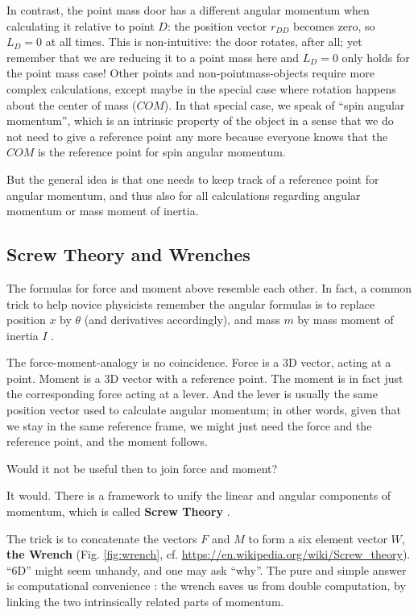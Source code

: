 In contrast, the point mass door has a different angular momentum when calculating it relative to point \(D\): the position vector \(r_{DD}\) becomes zero, so \(L_{D} = 0\) at all times.
This is non-intuitive: the door rotates, after all; yet remember that we are reducing it to a point mass here and \(L_{D} = 0\) only holds for the point mass case!
Other points and non-pointmass-objects require more complex calculations, except maybe in the special case where rotation happens about the center of mass (\(COM\)).
In that special case, we speak of ``spin angular momentum'', which is an intrinsic property of the object in a sense that we do not need to give a reference point any more because everyone knows that the \(COM\) is the reference point for spin angular momentum.


But the general idea is that one needs to keep track of a reference point for angular momentum, and thus also for all calculations regarding angular momentum or mass moment of inertia.


\FloatBarrier
\subsection{Screw Theory and Wrenches}
\label{sec:org14c81d2}

The formulas for force and moment above resemble each other.
In fact, a common trick to help novice physicists remember the angular formulas is to replace position \(x\) by \(\theta\) (and derivatives accordingly), and mass \(m\) by mass moment of inertia \(I\) \citep{Tipler2007}.

The force-moment-analogy is no coincidence.
Force is a 3D vector, acting at a point.
Moment is a 3D vector with a reference point.
The moment is in fact just the corresponding force acting at a lever.
And the lever is usually the same position vector used to calculate angular momentum; in other words, given that we stay in the same reference frame, we might just need the force and the reference point, and the moment follows.

Would it not be useful then to join force and moment?


It would.
There is a framework to unify the linear and angular components of momentum, which is called \textbf{Screw Theory} \citep{Ball1876,Lynch2017}.

The trick is to concatenate the vectors \(F\) and \(M\) to form a six element vector \(W\), \textbf{the Wrench} (Fig. \ref{fig:wrench}, cf. \url{https://en.wikipedia.org/wiki/Screw\_theory}).
``6D'' might seem unhandy, and one may ask ``why''.
The pure and simple answer is computational convenience \citep{Dumas2004,Mueller2018}: the wrench saves us from double computation, by linking the two intrinsically related parts of momentum.

